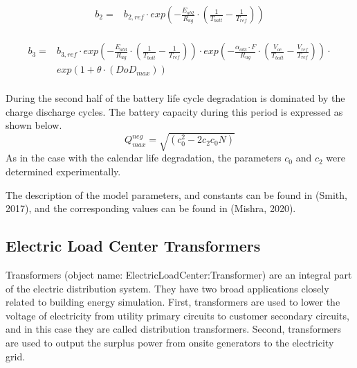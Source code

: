\begin{equation}
\begin{split}
    b_2 = & b_{2,ref} \cdot exp\left(-\frac{E_{ab2}}{R_{ug}} \cdot \left(\frac{1}{T_{batt}} - \frac{1}{T_{ref}}\right) \right) \\
\end{split}
\label{Equation: b2_computation}
\end{equation}

\begin{equation}
\begin{split}
    b_3 = & b_{3,ref} \cdot exp\left(-\frac{E_{ab3}}{R_{ug}} \cdot \left(\frac{1}{T_{batt}} - \frac{1}{T_{ref}}\right) \right) \cdot
exp\left(-\frac{\alpha_{ab3}\cdot F}{R_{ug}} \cdot \left(\frac{V_{oc}}{T_{batt}} - \frac{V_{ref}}{T_{ref}}\right) \right) \cdot  \\
& exp\left(1 + \theta \cdot (DoD_{max})\right) \\
\end{split}
\label{Equation: b3_computation}
\end{equation}

During the second half of the battery life cycle degradation is dominated by the charge discharge cycles. The battery capacity during this period is expressed as shown below.  
\begin{equation}
Q_{max}^{neg}=\sqrt{(c_0^2-2c_2 c_0 N)}                             
\label{Equation: b2_computation}
\end{equation}
As in the case with the calendar life degradation, the parameters $c_0$ and $c_2$ were determined experimentally. 

The description of the model parameters, and constants can be found in (Smith, 2017), and the corresponding values can be found in (Mishra, 2020). 

\subsection{Electric Load Center Transformers}\label{electric-load-center-transformers}

Transformers (object name: ElectricLoadCenter:Transformer) are an integral part of the electric distribution system. They have two broad applications closely related to building energy simulation. First, transformers are used to lower the voltage of electricity from utility primary circuits to customer secondary circuits, and in this case they are called distribution transformers. Second, transformers are used to output the surplus power from onsite generators to the electricity grid.

